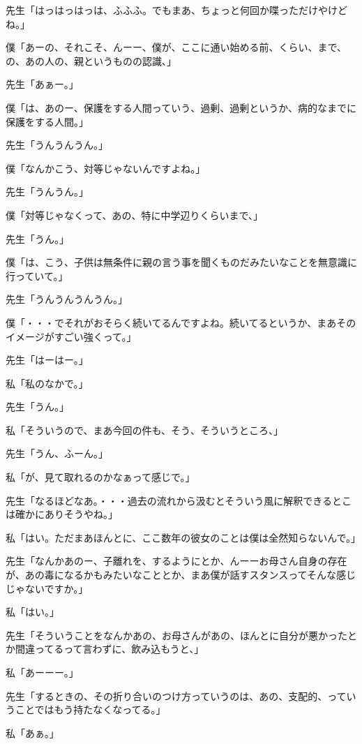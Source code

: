 \documentclass[b5j,twoside,twocolumn]{utarticle}
\begin{document}
\begin{description}
\item 先生「はっはっはっは、ふふふ。でもまあ、ちょっと何回か喋っただけやけどね。」
\item 僕「あーの、それこそ、んーー、僕が、ここに通い始める前、くらい、まで、の、あの人の、親というものの認識、」
\item 先生「あぁー。」
\item 僕「は、あのー、保護をする人間っていう、過剰、過剰というか、病的なまでに保護をする人間。」
\item 先生「うんうんうん。」
\item 僕「なんかこう、対等じゃないんですよね。」
\item 先生「うんうん。」
\item 僕「対等じゃなくって、あの、特に中学辺りくらいまで、」
\item 先生「うん。」
\item 僕「は、こう、子供は無条件に親の言う事を聞くものだみたいなことを無意識に行っていて。」
\item 先生「うんうんうんうん。」
\item 僕「・・・でそれがおそらく続いてるんですよね。続いてるというか、まあそのイメージがすごい強くって。」
\item 先生「はーはー。」
\item 私「私のなかで。」
\item 先生「うん。」
\item 私「そういうので、まあ今回の件も、そう、そういうところ、」
\item 先生「うん、ふーん。」
\item 私「が、見て取れるのかなぁって感じで。」
\item 先生「なるほどなあ。・・・過去の流れから汲むとそういう風に解釈できるとこは確かにありそうやね。」
\item 私「はい。ただまあほんとに、ここ数年の彼女のことは僕は全然知らないんで。」
\item 先生「なんかあのー、子離れを、するようにとか、んーーお母さん自身の存在が、あの毒になるかもみたいなこととか、まあ僕が話すスタンスってそんな感じじゃないですか。」
\item 私「はい。」
\item 先生「そういうことをなんかあの、お母さんがあの、ほんとに自分が悪かったとか間違ってるって言わずに、飲み込もうと、」
\item 私「あーーー。」
\item 先生「するときの、その折り合いのつけ方っていうのは、あの、支配的、っていうことではもう持たなくなってる。」
\item 私「あぁ。」

\end{description}
\end{document}
